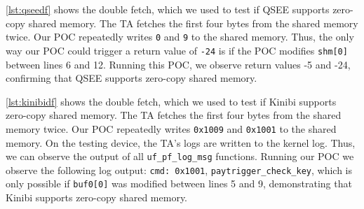 \documentclass[conference]{IEEEtran}
\newcommand{\stagetwo}{Fetch-Anchored Fuzzing\xspace}
\newcommand{\kinibi}{Kinibi\xspace}
\newcommand{\qsee}{QSEE\xspace}
\begin{document}
\autoref{lst:qseedf} shows the double fetch, which we used to test if \qsee  
supports zero-copy shared memory. The TA fetches the first four bytes from the 
shared memory twice. Our POC repeatedly writes \texttt{0} and \texttt{9} to 
the shared memory. Thus, the only way our POC could trigger a return value of \texttt{-24} 
is if the POC modifies \texttt{shm[0]} between lines 6 and 12. Running this POC, 
we observe return values -5 and -24, confirming that \qsee supports zero-copy 
shared memory.


\autoref{lst:kinibidf} shows the double fetch, which we used to test if \kinibi 
supports zero-copy shared memory. The TA fetches the first four bytes from the 
shared memory twice. Our POC repeatedly writes \texttt{0x1009} and \texttt{0x1001} to 
the shared memory. On the testing device, the TA's logs are written to the kernel log.
Thus, we can observe the output of all \texttt{uf\_pf\_log\_msg} functions. Running our 
POC we observe the following log output: \texttt{cmd: 0x1001}, \texttt{paytrigger\_check\_key}, 
which is only possible if \texttt{buf0[0]} was modified between lines 5 and 9, demonstrating 
that \kinibi supports zero-copy shared memory.

%
%



\end{document}
